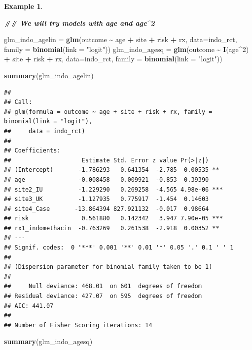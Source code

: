 \documentclass[
  openany]{book}
\newenvironment{Shaded}{\begin{snugshade}}{\end{snugshade}}
\newcommand{\AttributeTok}[1]{\textcolor[rgb]{0.13,0.29,0.53}{#1}}
\newcommand{\DecValTok}[1]{\textcolor[rgb]{0.00,0.00,0.81}{#1}}
\newcommand{\DocumentationTok}[1]{\textcolor[rgb]{0.56,0.35,0.01}{\textbf{\textit{#1}}}}
\newcommand{\FunctionTok}[1]{\textcolor[rgb]{0.13,0.29,0.53}{\textbf{#1}}}
\newcommand{\NormalTok}[1]{#1}
\newcommand{\OtherTok}[1]{\textcolor[rgb]{0.56,0.35,0.01}{#1}}
\newcommand{\SpecialCharTok}[1]{\textcolor[rgb]{0.81,0.36,0.00}{\textbf{#1}}}
\newcommand{\StringTok}[1]{\textcolor[rgb]{0.31,0.60,0.02}{#1}}
\theoremstyle{definition}
\theoremstyle{definition}
\newtheorem{example}{Example}[chapter]
\theoremstyle{definition}
\theoremstyle{definition}
\theoremstyle{remark}
\begin{document}
\begin{example}
\begin{Shaded}
\begin{Highlighting}[]
\DocumentationTok{\#\# We will try models with age and age\^{}2}

\NormalTok{glm\_indo\_agelin }\OtherTok{=} \FunctionTok{glm}\NormalTok{(outcome }\SpecialCharTok{\textasciitilde{}}\NormalTok{ age }\SpecialCharTok{+}\NormalTok{ site }\SpecialCharTok{+}\NormalTok{ risk }\SpecialCharTok{+}\NormalTok{ rx, }\AttributeTok{data=}\NormalTok{indo\_rct, }
                      \AttributeTok{family =} \FunctionTok{binomial}\NormalTok{(}\AttributeTok{link =} \StringTok{"logit"}\NormalTok{))}
\NormalTok{glm\_indo\_agesq }\OtherTok{=} \FunctionTok{glm}\NormalTok{(outcome }\SpecialCharTok{\textasciitilde{}} \FunctionTok{I}\NormalTok{(age}\SpecialCharTok{\^{}}\DecValTok{2}\NormalTok{) }\SpecialCharTok{+}\NormalTok{ site }\SpecialCharTok{+}\NormalTok{ risk }\SpecialCharTok{+}\NormalTok{ rx, }\AttributeTok{data=}\NormalTok{indo\_rct, }
                     \AttributeTok{family =} \FunctionTok{binomial}\NormalTok{(}\AttributeTok{link =} \StringTok{"logit"}\NormalTok{))}

\FunctionTok{summary}\NormalTok{(glm\_indo\_agelin)}
\end{Highlighting}
\end{Shaded}

\begin{verbatim}
## 
## Call:
## glm(formula = outcome ~ age + site + risk + rx, family = binomial(link = "logit"), 
##     data = indo_rct)
## 
## Coefficients:
##                    Estimate Std. Error z value Pr(>|z|)    
## (Intercept)       -1.786293   0.641354  -2.785  0.00535 ** 
## age               -0.008458   0.009921  -0.853  0.39390    
## site2_IU          -1.229290   0.269258  -4.565 4.98e-06 ***
## site3_UK          -1.127935   0.775917  -1.454  0.14603    
## site4_Case       -13.864394 827.921132  -0.017  0.98664    
## risk               0.561880   0.142342   3.947 7.90e-05 ***
## rx1_indomethacin  -0.763269   0.261538  -2.918  0.00352 ** 
## ---
## Signif. codes:  0 '***' 0.001 '**' 0.01 '*' 0.05 '.' 0.1 ' ' 1
## 
## (Dispersion parameter for binomial family taken to be 1)
## 
##     Null deviance: 468.01  on 601  degrees of freedom
## Residual deviance: 427.07  on 595  degrees of freedom
## AIC: 441.07
## 
## Number of Fisher Scoring iterations: 14
\end{verbatim}

\begin{Shaded}
\begin{Highlighting}[]
\FunctionTok{summary}\NormalTok{(glm\_indo\_agesq)}
\end{Highlighting}
\end{Shaded}


\end{example}
\end{document}

